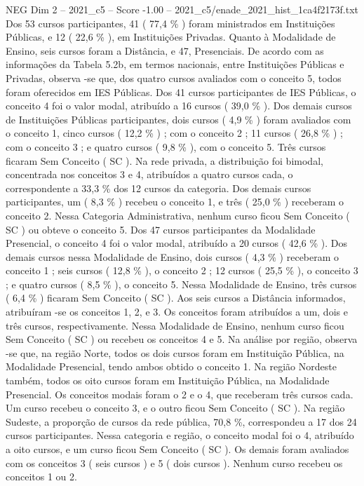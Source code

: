 \begin{textsample}{NEG Dim 2 – 2021\_c5 – Score -1.00 – 2021\_c5/enade\_2021\_hist\_1ca4f2173f.txt}
Dos 53 cursos participantes, 41 ( 77,4 \% ) foram ministrados em Instituições Públicas, e 12 ( 22,6 \% ), em Instituições Privadas.
Quanto à Modalidade de Ensino, seis cursos foram a Distância, e 47, Presenciais.
De acordo com as informações da Tabela 5.2b, em termos nacionais, entre Instituições Públicas e Privadas, observa -se que, dos quatro cursos avaliados com o conceito 5, todos foram oferecidos em IES Públicas.
Dos 41 cursos participantes de IES Públicas, o conceito 4 foi o valor modal, atribuído a 16 cursos ( 39,0 \% ).
Dos demais cursos de Instituições Públicas participantes, dois cursos ( 4,9 \% ) foram avaliados com o conceito 1, cinco cursos ( 12,2 \% ) ; com o conceito 2 ; 11 cursos ( 26,8 \% ) ; com o conceito 3 ; e quatro cursos ( 9,8 \% ), com o conceito 5.
Três cursos ficaram Sem Conceito ( SC ).
Na rede privada, a distribuição foi bimodal, concentrada nos conceitos 3 e 4, atribuídos a quatro cursos cada, o correspondente a 33,3 \% dos 12 cursos da categoria.
Dos demais cursos participantes, um ( 8,3 \% ) recebeu o conceito 1, e três ( 25,0 \% ) receberam o conceito 2.
Nessa Categoria Administrativa, nenhum curso ficou Sem Conceito ( SC ) ou obteve o conceito 5.
Dos 47 cursos participantes da Modalidade Presencial, o conceito 4 foi o valor modal, atribuído a 20 cursos ( 42,6 \% ).
Dos demais cursos nessa Modalidade de Ensino, dois cursos ( 4,3 \% ) receberam o conceito 1 ; seis cursos ( 12,8 \% ), o conceito 2 ; 12 cursos ( 25,5 \% ), o conceito 3 ; e quatro cursos ( 8,5 \% ), o conceito 5.
Nessa Modalidade de Ensino, três cursos ( 6,4 \% ) ficaram Sem Conceito ( SC ).
Aos seis cursos a Distância informados, atribuíram -se os conceitos 1, 2, e 3.
Os conceitos foram atribuídos a um, dois e três cursos, respectivamente.
Nessa Modalidade de Ensino, nenhum curso ficou Sem Conceito ( SC ) ou recebeu os conceitos 4 e 5.
Na análise por região, observa -se que, na região Norte, todos os dois cursos foram em Instituição Pública, na Modalidade Presencial, tendo ambos obtido o conceito 1.
Na região Nordeste também, todos os oito cursos foram em Instituição Pública, na Modalidade Presencial.
Os conceitos modais foram o 2 e o 4, que receberam três cursos cada.
Um curso recebeu o conceito 3, e o outro ficou Sem Conceito ( SC ).
Na região Sudeste, a proporção de cursos da rede pública, 70,8 \%, correspondeu a 17 dos 24 cursos participantes.
Nessa categoria e região, o conceito modal foi o 4, atribuído a oito cursos, e um curso ficou Sem Conceito ( SC ).
Os demais foram avaliados com os conceitos 3 ( seis cursos ) e 5 ( dois cursos ).
Nenhum curso recebeu os conceitos 1 ou 2.

\end{textsample}
